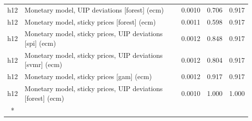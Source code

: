 \begin{ThreePartTable}
\begin{longtable}[t]{cp{5.5cm}ccc}
h12 & \raggedright Monetary model, UIP deviations [forest] (ecm) & 0.0010 & 0.706 & 0.917\\
h12 & \raggedright Monetary model, sticky prices [forest] (ecm) & 0.0011 & 0.598 & 0.917\\
h12 & \raggedright Monetary model, sticky prices, UIP deviations [spi] (ecm) & 0.0012 & 0.848 & 0.917\\
h12 & \raggedright Monetary model, sticky prices, UIP deviations [svmr] (ecm) & 0.0012 & 0.804 & 0.917\\
h12 & \raggedright Monetary model, sticky prices [gam] (ecm) & 0.0012 & 0.917 & 0.917\\
h12 & \raggedright Monetary model, sticky prices, UIP deviations [forest] (ecm) & 0.0010 & 1.000 & 1.000\\*
\end{longtable}
\end{ThreePartTable}
\endgroup{}
